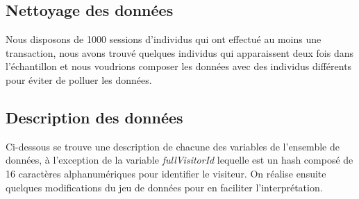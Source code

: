 
\subsection{Nettoyage des données}
Nous disposons de 1000 sessions d'individus qui ont effectué au moins une transaction, nous avons trouvé quelques individus qui apparaissent deux fois dans l'échantillon et nous voudrions composer les données avec des individus différents pour éviter de polluer  les données.

\subsection{Description des données}
Ci-dessous se trouve une description de chacune des variables de l'ensemble de données, à l'exception de la variable \textit{fullVisitorId} lequelle est un hash composé de 16 caractères alphanumériques pour identifier le visiteur. On réalise ensuite quelques modifications du jeu de données pour en faciliter l'interprétation.



